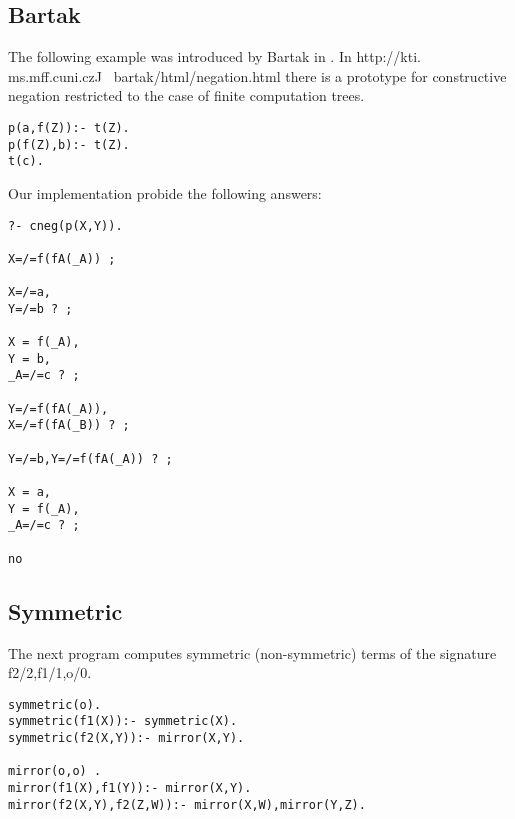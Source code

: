 \documentclass{tlp}
\begin{document}
\subsection*{Bartak}

The following example was introduced by Bartak in \cite{Bartak}. In
http://kti. ms.mff.cuni.czJ ~bartak/html/negation.html there is a prototype
for constructive negation restricted to the case of finite computation trees.

\begin{small}
\begin{verbatim}
p(a,f(Z)):- t(Z).
p(f(Z),b):- t(Z).
t(c).
\end{verbatim}
\end{small}

Our implementation probide the following answers:

\begin{small}
\begin{verbatim}
?- cneg(p(X,Y)).

X=/=f(fA(_A)) ;

X=/=a,
Y=/=b ? ;

X = f(_A),
Y = b,
_A=/=c ? ;

Y=/=f(fA(_A)),
X=/=f(fA(_B)) ? ;

Y=/=b,Y=/=f(fA(_A)) ? ;

X = a,
Y = f(_A),
_A=/=c ? ;

no
\end{verbatim}
\end{small}

\subsection*{Symmetric}

The next program computes symmetric (non-symmetric) terms of the signature
{f2/2,f1/1,o/0}. 
\begin{small}
\begin{verbatim}
symmetric(o). 
symmetric(f1(X)):- symmetric(X).
symmetric(f2(X,Y)):- mirror(X,Y).

mirror(o,o) .
mirror(f1(X),f1(Y)):- mirror(X,Y).
mirror(f2(X,Y),f2(Z,W)):- mirror(X,W),mirror(Y,Z).
\end{verbatim}
\end{small}
\end{document}
